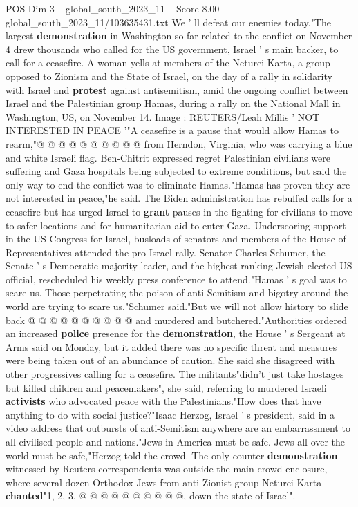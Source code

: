 \begin{textsample}{POS Dim 3 – global\_south\_2023\_11 – Score 8.00 – global\_south\_2023\_11/103635431.txt}
We ' ll defeat our enemies today."The largest \textbf{demonstration} in Washington so far related to the conflict on November 4 drew thousands who called for the US government, Israel ' s main backer, to call for a ceasefire.
A woman yells at members of the Neturei Karta, a group opposed to Zionism and the State of Israel, on the day of a rally in solidarity with Israel and \textbf{protest} against antisemitism, amid the ongoing conflict between Israel and the Palestinian group Hamas, during a rally on the National Mall in Washington, US, on November 14.
Image : REUTERS/Leah Millis ' NOT INTERESTED IN PEACE '"A ceasefire is a pause that would allow Hamas to rearm,"@ @ @ @ @ @ @ @ @ @ from Herndon, Virginia, who was carrying a blue and white Israeli flag.
Ben-Chitrit expressed regret Palestinian civilians were suffering and Gaza hospitals being subjected to extreme conditions, but said the only way to end the conflict was to eliminate Hamas."Hamas has proven they are not interested in peace,"he said.
The Biden administration has rebuffed calls for a ceasefire but has urged Israel to \textbf{grant} pauses in the fighting for civilians to move to safer locations and for humanitarian aid to enter Gaza.
Underscoring support in the US Congress for Israel, busloads of senators and members of the House of Representatives attended the pro-Israel rally.
Senator Charles Schumer, the Senate ' s Democratic majority leader, and the highest-ranking Jewish elected US official, rescheduled his weekly press conference to attend."Hamas ' s goal was to scare us.
Those perpetrating the poison of anti-Semitism and bigotry around the world are trying to scare us,"Schumer said."But we will not allow history to slide back @ @ @ @ @ @ @ @ @ @ and murdered and butchered."Authorities ordered an increased \textbf{police} presence for the \textbf{demonstration}, the House ' s Sergeant at Arms said on Monday, but it added there was no specific threat and measures were being taken out of an abundance of caution.
She said she disagreed with other progressives calling for a ceasefire.
The militants"didn't just take hostages but killed children and peacemakers", she said, referring to murdered Israeli \textbf{activists} who advocated peace with the Palestinians."How does that have anything to do with social justice?"Isaac Herzog, Israel ' s president, said in a video address that outbursts of anti-Semitism anywhere are an embarrassment to all civilised people and nations."Jews in America must be safe.
Jews all over the world must be safe,"Herzog told the crowd.
The only counter \textbf{demonstration} witnessed by Reuters correspondents was outside the main crowd enclosure, where several dozen Orthodox Jews from anti-Zionist group Neturei Karta \textbf{chanted}"1, 2, 3, @ @ @ @ @ @ @ @ @ @, down the state of Israel".

\end{textsample}
